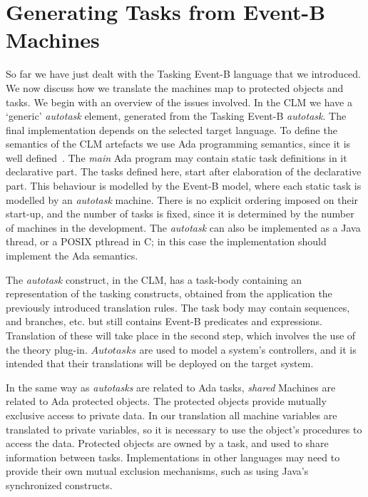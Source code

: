 \section{Generating Tasks from Event-B Machines}
%
So far we have just dealt with the Tasking Event-B language that we introduced. We now discuss how we translate the machines map to protected objects and tasks. We begin with an overview of the issues involved. In the CLM we have a `generic' \emph{autotask} element, generated from the Tasking Event-B \emph{autotask}. The final implementation depends on the selected target language. To define the semantics of the CLM artefacts we use Ada programming semantics, since it is well defined~\cite{ada2005}. The \emph{main} Ada program may contain static task definitions in it declarative part. The tasks defined here, start after elaboration of the declarative part. This behaviour is modelled by the Event-B model, where each static task is modelled by an \emph{autotask} machine. There is no explicit ordering imposed on their start-up, and  the number of tasks is fixed, since it is determined by the number of machines in the development. The \emph{autotask} can also be implemented as a Java thread, or a POSIX pthread in C; in this case the implementation should implement the Ada semantics.

 The \emph{autotask} construct, in the CLM, has a task-body containing an representation of the tasking constructs, obtained from the application the previously introduced translation rules. The task body may contain sequences, and branches, etc. but still contains Event-B predicates and expressions. Translation of these will take place in the second step, which involves the use of the theory plug-in. $Autotasks$ are used to model a system's controllers, and it is intended that their translations will be deployed on the target system.

In the same way as \emph{autotasks} are related to Ada tasks, \emph{shared} Machines are related to Ada protected objects. The protected objects provide mutually exclusive access to private data. In our translation all machine variables are translated to private variables, so it is necessary to use the object's procedures to access the data. Protected objects are owned by a task, and used to share information between tasks. Implementations in other languages may need to provide their own mutual exclusion mechanisms, such as using Java's synchronized constructs. 

